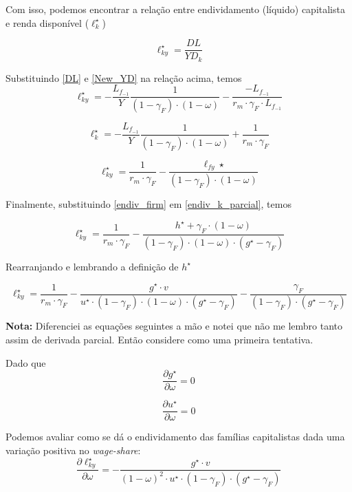 \documentclass[11pt]{article}
\begin{document}
Com isso, podemos encontrar a relação entre endividamento (líquido) capitalista e renda disponível (\(\ell_k^\star\))

$$
\ell_{ky}^\star = \frac{DL}{YD_k}
$$

Substituindo \ref{DL} e \ref{New_YD} na relação acima, temos
\begin{equation}
\ell_{ky}^\star = -\frac{L_{f_{-1}}}{Y}\frac{1}{(1-\gamma_F)\cdot (1-\omega)} - \frac{-L_{f_{-1}}}{r_m\cdot \gamma_F\cdot L_{f_{-1}}}
\end{equation}

\begin{equation}
\ell_k^\star = -\frac{L_{f_{-1}}}{Y}\frac{1}{(1-\gamma_F)\cdot (1-\omega)} + \frac{1}{r_m\cdot \gamma_F}
\end{equation}

\begin{equation}
\label{endiv_k_parcial}
\ell_{ky}^\star = \frac{1}{r_m\cdot \gamma_F} - \frac{\ell_{fy}\star}{(1-\gamma_F)\cdot (1-\omega)}
\end{equation}

Finalmente, substituindo \ref{endiv_firm} em \ref{endiv_k_parcial}, temos

\begin{equation}
\ell_{ky}^\star = \frac{1}{r_m\cdot \gamma_F} - \frac{h^\star + \gamma_F\cdot (1-\omega)}{(1-\gamma_F)\cdot (1-\omega)\cdot (g^\star - \gamma_F)}
\end{equation}

Rearranjando e lembrando a definição de \(h^\star\)

\begin{equation}
\ell_{ky}^\star = \frac{1}{r_m\cdot \gamma_F} - \frac{g^\star\cdot v}{u^\star \cdot (1-\gamma_F)\cdot (1-\omega)\cdot (g^\star - \gamma_F)} - \frac{\gamma_F}{(1-\gamma_F)\cdot (g^\star - \gamma_F)}
\end{equation}

\textbf{Nota:} Diferenciei as equações seguintes a mão e notei que não me lembro tanto assim de derivada parcial. Então considere como uma primeira tentativa.

Dado que
$$
\frac{\partial g^\star}{\partial \omega} = 0
$$

$$
\frac{\partial u^\star}{\partial \omega} = 0
$$


Podemos avaliar como se dá o endividamento das famílias capitalistas dada uma variação positiva no \emph{wage-share}:
$$
\frac{\partial \ell_{ky}^\star}{\partial \omega} = -\frac{g^\star\cdot v}{(1-\omega)^2\cdot u^\star \cdot (1-\gamma_F)\cdot (g^\star - \gamma_F)}
$$
\end{document}
